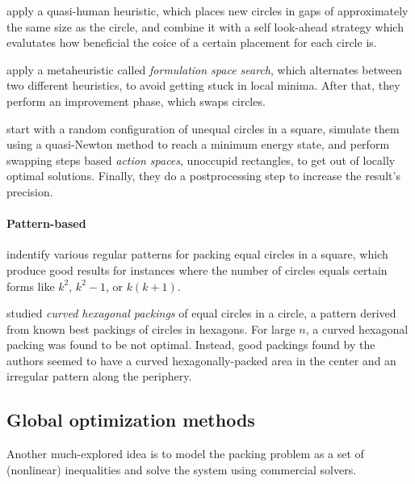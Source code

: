 \documentclass[a4paper,style=print,bibliography=totoc,nexus,lnum,extramargin]{tubsbook}
\begin{document}
\textcite{HLLX2006new} apply a quasi-human heuristic, which places new circles in gaps of approximately the same size as the circle, and combine it with a self look-ahead strategy which evalutates how beneficial the coice of a certain placement for each circle is.

\textcite{LB2013packing} apply a metaheuristic called \emph{formulation space search}, which alternates between two different heuristics, to avoid getting stuck in local minima. After that, they perform an improvement phase, which swaps circles.

\textcite{HHY2015action} start with a random configuration of unequal circles in a square, simulate them using a quasi-Newton method to reach a minimum energy state, and perform swapping steps based \emph{action spaces}, unoccupid rectangles, to get out of locally optimal solutions. Finally, they do a postprocessing step to increase the result's precision.

\paragraph{Pattern-based}

\textcite{GL1996repeated} indentify various regular patterns for packing equal circles in a square, which produce good results for instances where the number of circles equals certain forms like $k^2$, $k^2-1$, or $k(k+1)$.

\textcite{lubachevsky1997curved} studied \emph{curved hexagonal packings} of equal circles in a circle, a pattern derived from known best packings of circles in hexagons. For large $n$, a curved hexagonal packing was found to be not optimal. Instead, good packings found by the authors seemed to have a curved hexagonally-packed area in the center and an irregular pattern along the periphery.


\subsection{Global optimization methods}

Another much-explored idea is to model the packing problem as a set of (nonlinear) inequalities and solve the system using commercial solvers. 
\end{document}
